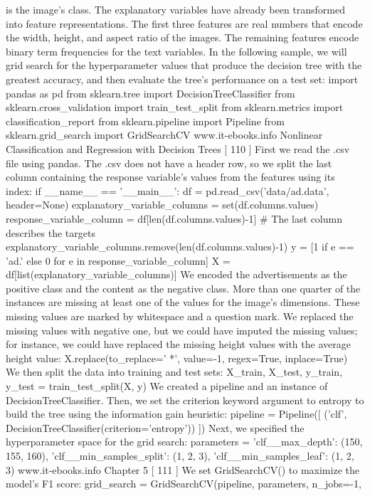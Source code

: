 is the image's class. The explanatory variables have already been transformed into
feature representations. The first three features are real numbers that encode the width,
height, and aspect ratio of the images. The remaining features encode binary term
frequencies for the text variables. In the following sample, we will grid search for the
hyperparameter values that produce the decision tree with the greatest accuracy,
and then evaluate the tree's performance on a test set:
import pandas as pd
from sklearn.tree import DecisionTreeClassifier
from sklearn.cross_validation import train_test_split
from sklearn.metrics import classification_report
from sklearn.pipeline import Pipeline
from sklearn.grid_search import GridSearchCV
www.it-ebooks.info
Nonlinear Classification and Regression with Decision Trees
[ 110 ]
First we read the .csv file using pandas. The .csv does not have a header row,
so we split the last column containing the response variable's values from the
features using its index:
if __name__ == '__main__':
df = pd.read_csv('data/ad.data', header=None)
explanatory_variable_columns = set(df.columns.values)
response_variable_column = df[len(df.columns.values)-1]
# The last column describes the targets
explanatory_variable_columns.remove(len(df.columns.values)-1)
y = [1 if e == 'ad.' else 0 for e in response_variable_column]
X = df[list(explanatory_variable_columns)]
We encoded the advertisements as the positive class and the content as the negative
class. More than one quarter of the instances are missing at least one of the values
for the image's dimensions. These missing values are marked by whitespace and a
question mark. We replaced the missing values with negative one, but we could have
imputed the missing values; for instance, we could have replaced the missing height
values with the average height value:
X.replace(to_replace=' *\?', value=-1, regex=True, inplace=True)
We then split the data into training and test sets:
X_train, X_test, y_train, y_test = train_test_split(X, y)
We created a pipeline and an instance of DecisionTreeClassifier. Then, we set
the criterion keyword argument to entropy to build the tree using the information
gain heuristic:
pipeline = Pipeline([
('clf', DecisionTreeClassifier(criterion='entropy'))
])
Next, we specified the hyperparameter space for the grid search:
parameters = {
	'clf__max_depth': (150, 155, 160),
	'clf__min_samples_split': (1, 2, 3),
	'clf__min_samples_leaf': (1, 2, 3)
}
www.it-ebooks.info
Chapter 5
[ 111 ]
We set GridSearchCV() to maximize the model's F1 score:
grid_search = GridSearchCV(pipeline, parameters, n_jobs=-1,
